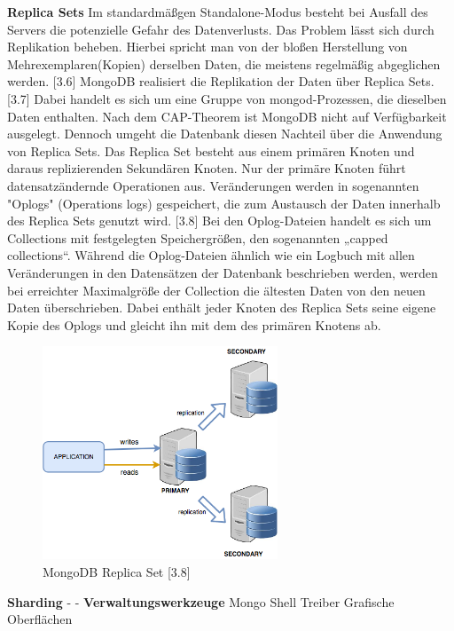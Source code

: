 \textbf{Replica Sets}
\newline
Im standardmäßgen Standalone-Modus besteht bei Ausfall des Servers die potenzielle Gefahr des Datenverlusts. Das Problem lässt sich durch Replikation beheben. Hierbei spricht man von der bloßen Herstellung von Mehrexemplaren(Kopien) derselben Daten, die meistens regelmäßig abgeglichen werden. [3.6] MongoDB realisiert die Replikation der Daten über Replica Sets. [3.7] Dabei handelt es sich um eine Gruppe von mongod-Prozessen, die dieselben Daten enthalten. Nach dem CAP-Theorem ist MongoDB nicht auf Verfügbarkeit ausgelegt. Dennoch umgeht die Datenbank diesen Nachteil über die Anwendung von Replica Sets. Das Replica Set besteht aus einem primären Knoten und daraus replizierenden Sekundären Knoten. 
Nur der primäre Knoten führt datensatzändernde Operationen aus. Veränderungen werden in sogenannten "Oplogs" (Operations logs) gespeichert, die zum Austausch der Daten innerhalb des Replica Sets genutzt wird. [3.8]  Bei den Oplog-Dateien handelt es sich um Collections mit festgelegten Speichergrößen, den sogenannten „capped collections“. Während die Oplog-Dateien ähnlich wie ein Logbuch mit allen Veränderungen in den Datensätzen der Datenbank beschrieben werden, werden bei erreichter Maximalgröße der Collection die ältesten Daten von den neuen Daten überschrieben. Dabei enthält jeder Knoten des Replica Sets seine eigene Kopie des Oplogs und gleicht ihn mit dem des primären Knotens ab.

\begin{figure}[htb]
\centering
\includegraphics[width=7cm]{images/replicaset1.png}
\caption{MongoDB Replica Set [3.8]}
\end{figure}



\textbf{Sharding}
-
\newline
-
\textbf{Verwaltungswerkzeuge}
Mongo Shell
Treiber
Grafische Oberflächen
